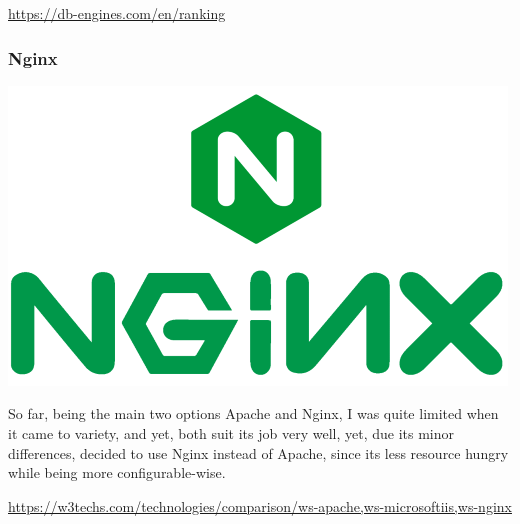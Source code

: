 \documentclass[11pt]{article}
\begin{document}
        \url{https://db-engines.com/en/ranking}

        \subsubsection[Nginx]{Nginx}

        \begin{center}
            \includegraphics[scale=0.3]{logo_nginx}
        \end{center}
        \begin{flushleft}
            So far, being the main two options Apache and Nginx, I was quite limited when it came to variety,
            and yet, both suit its job very well, yet, due its minor differences, decided to use Nginx instead of Apache,
            since its less resource hungry while being more configurable-wise.
        \end{flushleft}


        \begin{flushleft}
            \url{https://w3techs.com/technologies/comparison/ws-apache,ws-microsoftiis,ws-nginx}
        \end{flushleft}
\end{document}
